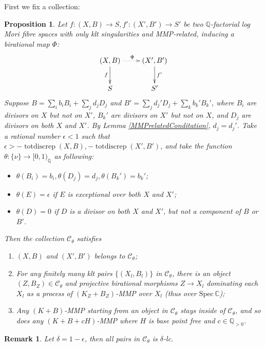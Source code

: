 \documentclass[11pt]{amsart}
\numberwithin{equation}{section}
\newtheorem{prop}[defn]{Proposition}
\newtheorem{rmk}[defn]{Remark}
\begin{document}
First we fix a collection: 
\begin{prop}\label{cat}
  \cite[Lemma 3.6]{brunoLogSarkisovProgram1995}
  Let $ f:(X,B)\to S,f':(X',B')\to S' $ be two $ \mathbb{Q} $-factorial log Mori fibre spaces  with only klt singularities and MMP-related, inducing a birational map $\Phi$:
  \[ \xymatrix{
      (X,B)\ar[d]_f\ar@{.>}[r]^\Phi&(X',B')\ar[d]^{f'}\\
 S&S'} \]
 Suppose  $ B=\sum_ib_iB_i+\sum_jd_jD_j $ and $ B'=\sum_jd_j'D_j+\sum_kb_k'B_k' $, where $ B_i $ are divisors on $ X $ but not on $ X' $, $ B_k' $ are divisors on $ X' $ but not on $ X $, and $ D_j $ are divisors on both $ X $ and $ X' $. By Lemma \ref{MMPrelatedConditation}, $ d_j=d_j' $. Take a rational number $ \epsilon<1 $ such that $ \epsilon> -\operatorname{totdiscrep}(X,B),-\operatorname{totdiscrep}(X',B') $, and take the function $ \theta:\{\nu\}\to [0,1)_\mathbb{Q} $ as following:
  \begin{itemize}
    \item $ \theta(B_i)=b_i, \theta(D_j)=d_j,\theta(B_k')=b_k'$;
    \item $ \theta(E)=\epsilon $ if $ E $ is exceptional over both $ X $ and $ X' $;
    \item $ \theta(D)=0 $ if $ D $ is a divisor on both $ X $ and $ X' $, but not a component of $ B $ or $ B' $.
  \end{itemize}
  Then the collection $ \mathcal{C}_\theta $ satisfies
  \begin{enumerate}
    \item $ (X,B) $ and $ (X',B') $ belongs to $ \mathcal{C}_\theta $;
    \item For any finitely many klt pairs $ \{(X_l,B_l)\} $ in $ \mathcal{C}_\theta $, there is an object $ (Z,B_Z)\in \mathcal{C}_\theta $ and projective birational morphisms $ Z\to X_l $ dominating each  $ X_l $ as a process of $ (K_{Z}+B_{Z}) $-MMP over $ X_l $ (thus over $ \mathrm{Spec}\,\mathbb{C} $);
    \item Any $ (K+B) $-MMP starting from an object in $ \mathcal{C}_\theta $ stays inside of $ \mathcal{C}_\theta $, and so does any $ (K+B+cH) $-MMP where $ H $ is base point free and $ c\in \mathbb{Q}_{>0} $. 
  \end{enumerate}
\end{prop}
\begin{rmk}
Let $\delta=1-\epsilon$, then all pairs in $\mathcal{C}_{\theta}$ is $\delta$-lc. 
\end{rmk}
\end{document}
